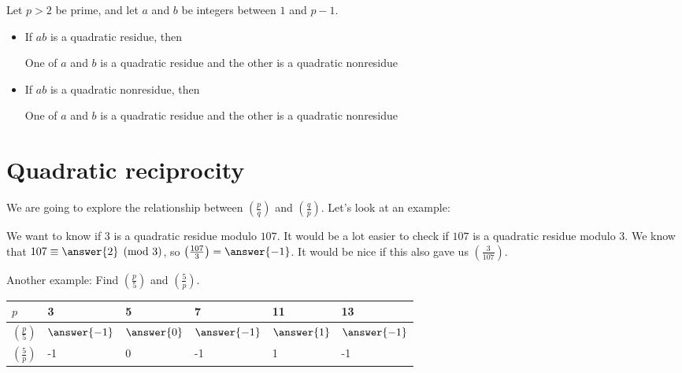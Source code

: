 \documentclass{ximera}
\theoremstyle{plain}
\begin{document}
\begin{question}
Let $p>2$ be prime, and let $a$ and $b$ be integers between $1$ and $p-1$.
\begin{itemize}
\item If $ab$ is a quadratic residue, then
\begin{selectAll}
\choice
{One of $a$ and $b$ is a quadratic residue and the other is a quadratic nonresidue}
\end{selectAll}
 \item If $ab$ is a quadratic nonresidue, then
\begin{selectAll}
\choice
{One of $a$ and $b$ is a quadratic residue and the other is a quadratic nonresidue}
\end{selectAll}
\end{itemize}
 
\end{question}


\section{Quadratic reciprocity}
We are going to explore the relationship between $\left(\frac{p}{q}\right)$ and $\left(\frac{q}{p}\right)$. Let's look at an example:
\begin{question}
 We want to know if $3$ is a quadratic residue modulo $107$. It would be a lot easier to check if $107$ is a quadratic residue modulo $3$. We know that $107\equiv \answer{2}
 \pmod 3$, so $\left(\frac{107}{3}\right)=\answer{-1}
 $. It would be nice if this also gave us $\left(\frac{3}{107}\right)$.
\end{question}

\begin{question}
 Another example: Find $\left(\frac{p}{5}\right)$ and $\left(\frac{5}{p}\right)$.
 
\begin{tabular}{|l||l|l|l|l|l|}\hline
$p$&3&5&7&11&13\\\hline\hline
$\left(\frac{p}{5}\right)$&$\answer{-1}$&$\answer{0}$&$\answer{-1}$&$\answer{1}$&$\answer{-1}$\\\hline
$\left(\frac{5}{p}\right)$&-1&0&-1&1&-1\\\hline
\end{tabular}
\end{question}
\end{document}
